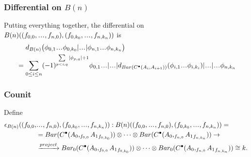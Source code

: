 \subsubsection{Differential on $B(n)$}
Putting everything together, 
the differential on \newline $B(n)(
(f_{0,0}, \smdots, f_{n,0}), 
(f_{0,k_0}, \smdots, f_{n,k_n}))$ is
\begin{align*}
&\phantom{{}={}}
d_{B(n)} \big(
  \phi_{0,1}\smdots\phi_{0,k_0} | \smdots |
  \phi_{n,1}\smdots\phi_{n,k_n} \big)\\
&= 
\sum \limits_{0 \leq i \leq n}
  (-1)^{\sum \limits_{p<i;q}
  |\phi_{p,q}|+1}
  \phi_{0,1}\smdots | \smdots |
  d_{Bar(C^\bullet(A_i, A_{i+1}))} 
  (\phi_{i,1}\smdots\phi_{i,k_i}) | \smdots |
  \smdots\phi_{n,k_n} 
\end{align*}
%
\subsubsection{Counit}
Define
\begin{align*}
\epsilon_{B(n)}((f_{0,0},&\smdots,f_{n,0}), 
  (f_{0,k_0},\smdots,f_{n,k_n})):
B(n)((f_{0,0},\smdots,f_{n,0}), 
  (f_{0,k_0},\smdots,f_{n,k_n})) =\\
&=
Bar(C^\bullet(A_0, _{f_{0,0}}{A_1}_{f_{0,k_0}})) 
  \otimes \cdots \otimes 
  Bar(C^\bullet(A_0, _{f_{n,0}}{A_1}_{f_{n,k_n}}))
  \to \\
&\xrightarrow{project}
  Bar_0(C^\bullet(A_0, _{f_{0,0}}{A_1}_{f_{0,k_0}})) 
  \otimes \cdots \otimes 
  Bar_0(C^\bullet(A_0, _{f_{n,0}}{A_1}_{f_{n,k_n}}))
\cong k.
\end{align*}
%
